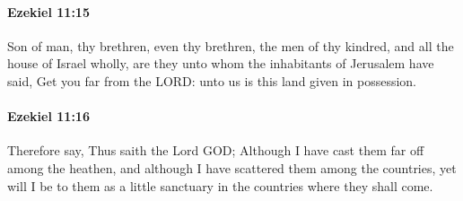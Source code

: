 		\paragraph{Ezekiel 11:15} %
			\label{EZEKIEL-11-15}

			Son of man, thy brethren, even thy brethren, the men of thy kindred, and all the house of Israel wholly, are they unto whom the inhabitants of Jerusalem have said, Get you far from the LORD: unto us is this land given in possession.


		\paragraph{Ezekiel 11:16} %
			\label{EZEKIEL-11-16}

			Therefore say, Thus saith the Lord GOD; Although I have cast them far off among the heathen, and although I have scattered them among the countries, yet will I be to them as a little sanctuary in the countries where they shall come.

